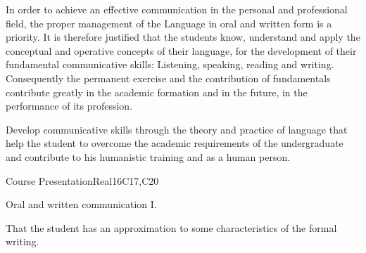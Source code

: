 \begin{syllabus}


\begin{justification}
In order to achieve an effective communication in the personal and professional field, the proper management of the Language in oral and written form is a priority. It is therefore justified that the students know, understand and apply the conceptual and operative concepts of their language, for the development of their fundamental communicative skills: Listening, speaking, reading and writing.
Consequently the permanent exercise and the contribution of fundamentals contribute greatly in the academic formation and in the future, in the performance of its profession.
\end{justification}

\begin{goals}
\item Develop communicative skills through the theory and practice of language that help the student to overcome the academic requirements of the undergraduate and contribute to his humanistic training and as a human person.
\end{goals}

\begin{outcomes}
   \item {}
   \item {}
   \item {}
\end{outcomes}

\begin{competences}
    \item {}
    \item {}
    \item {}
\end{competences}


\begin{unit}{Course Presentation}{}{Real}{16}{C17,C20}
  \begin{topics}
      \item Oral and written communication I.
  \end{topics}

  \begin{learningoutcomes}
   \item That the student has an approximation to some characteristics of the formal writing.
  \end{learningoutcomes}
\end{unit}


\end{syllabus}
